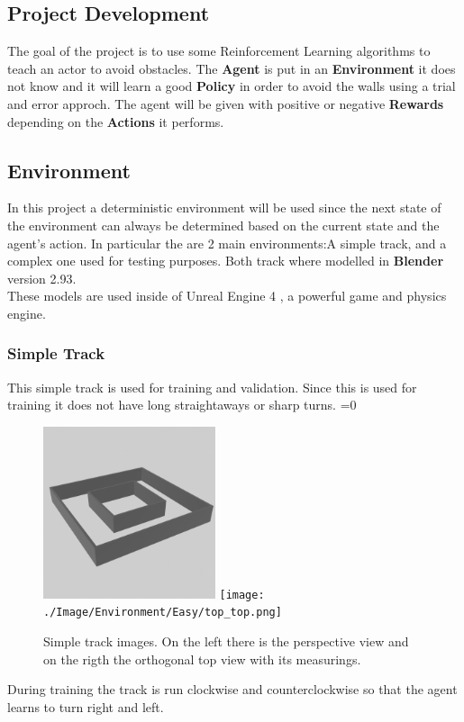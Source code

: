 \documentclass[14pt]{extarticle}
\def\sp{\vspace{5pt}}
\newcounter{debug}
\begin{document}
\newpage
\begin{center}
	\section{Project Development}
	\sp
\end{center}
\begin{flushleft}
	The goal of the project is to use some Reinforcement Learning algorithms to teach an actor to avoid obstacles. The \textbf{Agent} is put in an \textbf{Environment} it does not know and it will learn a good \textbf{Policy} in order to avoid the walls using a trial and error approch. The agent will be given with positive or negative \textbf{Rewards} depending on the \textbf{Actions} it performs. 
	
	\subsection{Environment}
	\sp
	In this project a deterministic environment will be used since the next state of the environment can always be determined based on the current state and the agent’s action. In particular the are 2 main environments:A simple track, and a complex one used for testing purposes. Both track where modelled in \textbf{Blender} version 2.93\cite{Blender}. \\
	These models are used inside of Unreal Engine 4 \cite{UE4}, a powerful game and physics engine.
	
	\subsubsection{Simple Track}
	This simple track is used for training and validation. Since this is used for training it does not have long straightaways or sharp turns.
	\ifnum\value{debug}=0 {
	\begin{figure}[H]
    		\centering\includegraphics[width=0.45\textwidth]{./Image/Environment/Easy/perspective.png}
    		\centering\texttt{[image: ./Image/Environment/Easy/top\_top.png]}
		\vspace{5mm}
		\caption{Simple track images. On the left there is the perspective view and on the rigth the orthogonal top view with its measurings.}
	\end{figure}
	}\fi
	During training the track is run clockwise and counterclockwise so that the agent learns to turn right and left.
	

\end{flushleft}
\end{document}

